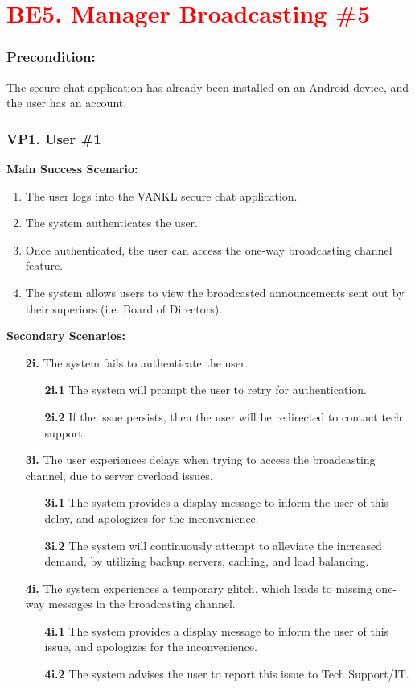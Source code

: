 \documentclass[]{article}
\begin{document}
\section*{\textcolor{red}{BE5. Manager Broadcasting \#5}}
\subsubsection*{Precondition:} The secure chat application has already been installed on an Android device, and the user has an account.
\subsubsection*{VP1. User \#1}
\textbf{Main Success Scenario:}
\begin{enumerate}
	\item The user logs into the VANKL secure chat application.
	\item The system authenticates the user.
	\item Once authenticated, the user can access the one-way broadcasting channel feature.
	\item The system allows users to view the broadcasted announcements sent out by their superiors (i.e. Board of Directors).
\end{enumerate}
\textbf{Secondary Scenarios:}
\begin{enumerate}
	\item[\textbf{2i.}] The system fails to authenticate the user.
		\begin{enumerate}
			\item[\textbf{2i.1}] The system will prompt the user to retry for authentication.
			\item[\textbf{2i.2}] If the issue persists, then the user will be redirected to contact tech support.
		\end{enumerate}
	\item[\textbf{3i.}] The user experiences delays when trying to access the broadcasting channel, due to server overload issues.
		\begin{enumerate}
			\item[\textbf{3i.1}] The system provides a display message to inform the user of this delay, and apologizes for the inconvenience.
			\item[\textbf{3i.2}] The system will continuously attempt to alleviate the increased demand, by utilizing backup servers, caching, and load balancing.
		\end{enumerate}
	\item[\textbf{4i.}] The system experiences a temporary glitch, which leads to missing one-way messages in the broadcasting channel.
		\begin{enumerate}
			\item[\textbf{4i.1}] The system provides a display message to inform the user of this issue, and apologizes for the inconvenience.
			\item[\textbf{4i.2}] The system advises the user to report this issue to Tech Support/IT.
		\end{enumerate}
\end{enumerate}
\end{document}
